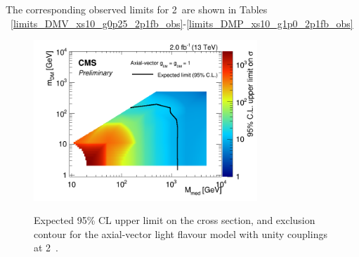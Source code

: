 
 
 
 

\clearpage
The corresponding observed limits for 2~\ifb are shown in Tables
~\ref{limits_DMV_xs10_g0p25_2p1fb_obs}-\ref{limits_DMP_xs10_g1p0_2p1fb_obs}



 
 
 



%
%



%
%


\begin{figure}
\begin{center}
\includegraphics[width=0.75\textwidth]{figures/DMplots/dm_A_g1p0_2p0fb_2dlimits.png} \\
\caption{Expected 95\% CL upper limit on the cross section, and exclusion
contour for the axial-vector light flavour model with unity couplings at 2~\ifb.}
\label{fig:dm_A_g1_2fb_2dlimits}
\end{center}
\end{figure}

